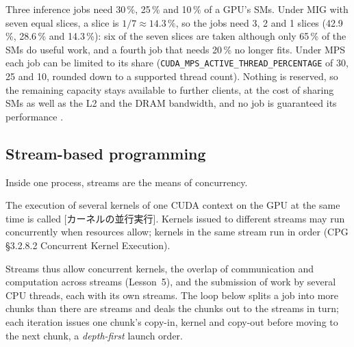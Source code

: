 \documentclass[../main.tex]{subfiles}
\begin{document}
\begin{example}
  \label{ex:l09-fit}
  Three inference jobs need 30\,\%, 25\,\% and 10\,\% of a GPU's SMs.
  Under MIG with seven equal slices, a slice is $1/7 \approx 14.3\,\%$,
  so the jobs need 3, 2 and 1 slices (42.9\,\%, 28.6\,\% and 14.3\,\%):
  six of the seven slices are taken although only 65\,\% of the SMs do
  useful work, and a fourth job that needs 20\,\% no longer fits.  Under
  MPS each job can be limited to its share
  (\texttt{CUDA\_MPS\_\allowbreak ACTIVE\_\allowbreak THREAD\_\allowbreak PERCENTAGE}
  of 30, 25 and 10, rounded down to a supported thread count).  Nothing
  is reserved, so the remaining capacity stays available to further
  clients, at the cost of sharing SMs as well as the L2 and the DRAM
  bandwidth, and no job is guaranteed its performance
  \cite[§1.1.2.2.5]{nvidia2026mps}.
\end{example}


\subsection{Stream-based programming}

Inside one process, streams are the means of concurrency.

\begin{definition}
  The execution of several kernels of one CUDA context on the GPU at
  the same time is called
  [カーネルの並行実行].  Kernels issued to different streams may run concurrently
  when resources allow; kernels in the same stream run in order (CPG
  §3.2.8.2 Concurrent Kernel Execution).
\end{definition}

%
Streams thus allow concurrent kernels, the overlap of communication and
computation across streams (Lesson~5), and the submission of work by
several CPU threads, each with its own streams.  The loop below splits a
job into more chunks than there are streams and deals the chunks out to
the streams in turn; each iteration issues one chunk's copy-in, kernel
and copy-out before moving to the next chunk, a \emph{depth-first}
launch order.
\end{document}
